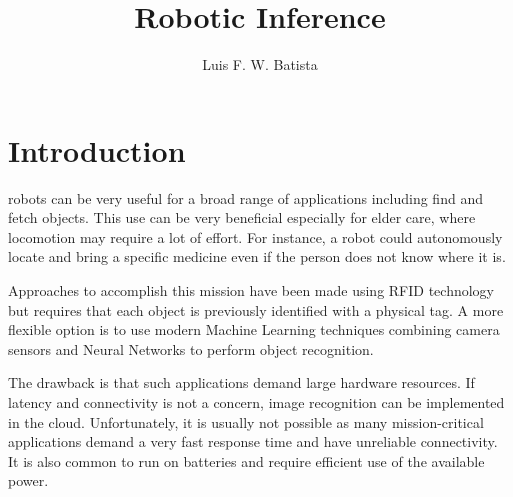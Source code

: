 \documentclass[10pt,journal,compsoc]{IEEEtran}
\begin{document}
\title{Robotic Inference}

\author{Luis F. W. Batista}

%
{}

\maketitle
\IEEEdisplaynontitleabstractindextext
\IEEEpeerreviewmaketitle
\section{Introduction}
\label{sec:introduction}

 robots can be very useful for a broad range of applications including find and fetch objects. This use can be very beneficial especially for elder care, where locomotion may require a lot of effort. For instance, a robot could autonomously locate and bring a specific medicine even if the person does not know where it is. 

Approaches to accomplish this mission have been made using RFID technology \cite{inproceedings} but requires that each object is previously identified with a physical tag. A more flexible option is to use modern Machine Learning techniques combining camera sensors and Neural Networks to perform object recognition. 

The drawback is that such applications demand large hardware resources. If latency and connectivity is not a concern, image recognition can be implemented in the cloud. Unfortunately, it is usually not possible as many mission-critical applications demand a very fast response time and have unreliable connectivity. It is also common to run on batteries and require efficient use of the available power.
\end{document}

